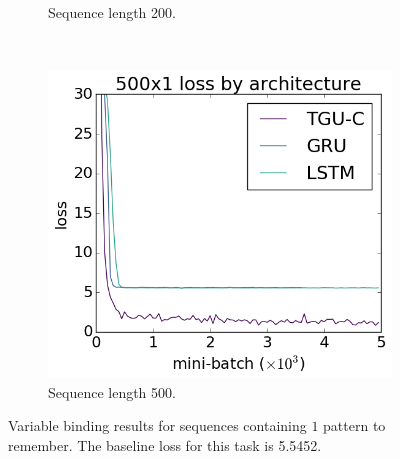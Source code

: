 \begin{figure}[tbh]
\begin{subfigure}[t]{0.3\linewidth}
	\caption{Sequence length 200.}
\end{subfigure}~
\begin{subfigure}[t]{0.3\linewidth}
	\includegraphics[width=\linewidth]{exps/vbind/plots/500x1}
	\caption{Sequence length 500.}
\end{subfigure}

\caption[Variable binding results, one pattern]
{Variable binding results for sequences containing \(1\) pattern to remember. The baseline loss for this
task is 5.5452.}
\label{fig:vbindn1}
\end{figure}

